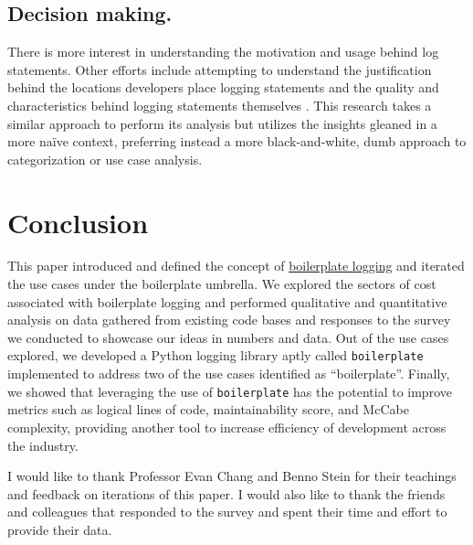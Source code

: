\documentclass[acmsmall,review,authorversion]{acmart}
\newcommand{\code}[1]{\lstinline[basicstyle=\ttfamily\small]~#1~}
\begin{document}
    \subsection{Decision making.} There is more interest in understanding the motivation and usage behind log statements. Other efforts include attempting to understand the justification behind the locations developers place logging statements \cite{DBLP:conf/icse/FuZHLDLZX14} and the quality and characteristics behind logging statements themselves \cite{DBLP:conf/icse/YuanPZ12}. This research takes a similar approach to perform its analysis but utilizes the insights gleaned in a more naïve context, preferring instead a more black-and-white, dumb approach to categorization or use case analysis.

\section{Conclusion}

This paper introduced and defined the concept of \underline{boilerplate logging} and iterated the use cases under the boilerplate umbrella. We explored the sectors of cost associated with boilerplate logging and performed qualitative and quantitative analysis on data gathered from existing code bases and responses to the survey we conducted to showcase our ideas in numbers and data. Out of the use cases explored, we developed a Python logging library aptly called \code{boilerplate} implemented to address two of the use cases identified as ``boilerplate''. Finally, we showed that leveraging the use of \code{boilerplate} has the potential to improve metrics such as logical lines of code, maintainability score, and McCabe complexity, providing another tool to increase efficiency of development across the industry.

\begin{acks}
I would like to thank Professor Evan Chang and Benno Stein for their teachings and feedback on iterations of this paper. I would also like to thank the friends and colleagues that responded to the survey and spent their time and effort to provide their data.
\end{acks}




\end{document}
